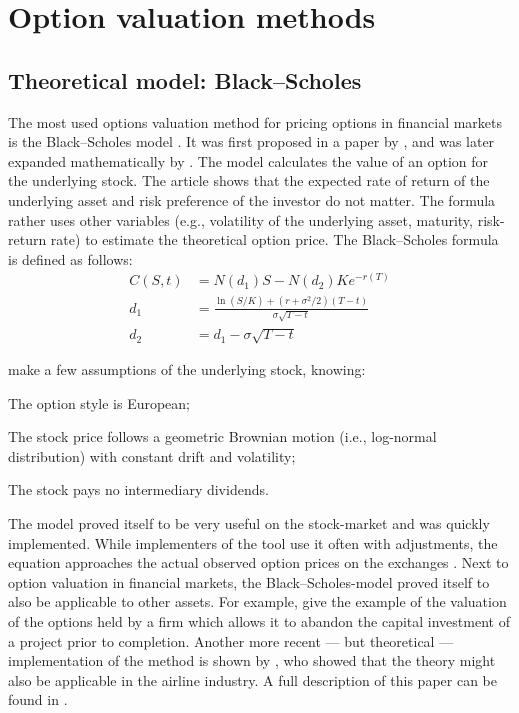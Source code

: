 \section{Option valuation methods}
\subsection{Theoretical model: Black--Scholes}
The most used options valuation method for pricing options in financial markets is the Black--Scholes model \cite{hull99}.  It was first proposed in a paper by , and was later expanded mathematically by . The model calculates the value of an option for the underlying stock. The article shows that the expected rate of return of the underlying asset and risk preference of the investor do not matter. The formula rather uses other variables (e.g., volatility of the underlying asset, maturity, risk-return rate) to estimate the theoretical option price. The Black--Scholes formula is defined as follows:
\begin{align*}
C(S, t) &= N(d_1)S - N(d_2) Ke^{-r(T)} \\
d_1 &= \frac{\ln(S/K) + (r + \sigma^2/2)(T - t)}{\sigma \sqrt{T - t}} \\
d_2 &= d_1 - \sigma \sqrt{T - t}
\end{align*}

\noindent
{} make a few assumptions of the underlying stock, knowing: 
\begin{compactitem}
\item The option style is European;
\item The stock price follows a geometric Brownian motion (i.e., log-normal distribution) with constant drift and volatility;
\item The stock pays no intermediary dividends.
\end{compactitem}
The model proved itself to be very useful on the stock-market and was quickly implemented. While implementers of the tool use it often with adjustments, the equation approaches the actual observed option prices on the exchanges \cite{bodie2008investments}. 
Next to option valuation in financial markets, the Black--Scholes-model proved itself to also be applicable to other assets. For example,  give the example of the valuation of the options held by a firm which allows it to abandon the capital investment of a project prior to completion. Another more recent --- but theoretical --- implementation of the method is shown by , who showed that the theory might also be applicable in the airline industry. A full description of this paper can be found in .


